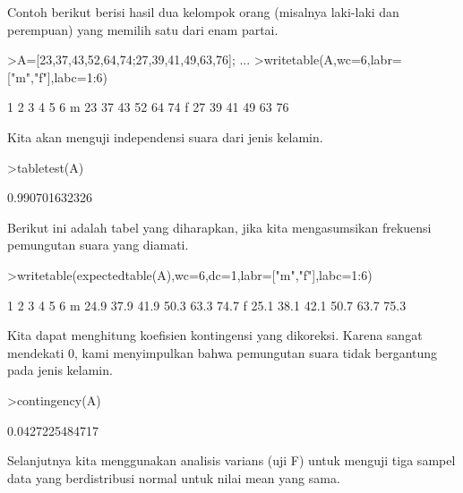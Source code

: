 \documentclass{article}
\begin{document}
\begin{eulernotebook}
\begin{eulercomment}
\begin{eulercomment}
\begin{eulercomment}
Contoh berikut berisi hasil dua kelompok orang (misalnya laki-laki dan
perempuan) yang memilih satu dari enam partai.
\end{eulercomment}
\begin{eulerprompt}
>A=[23,37,43,52,64,74;27,39,41,49,63,76];  ...
>writetable(A,wc=6,labr=["m","f"],labc=1:6)
\end{eulerprompt}
\begin{euleroutput}
             1     2     3     4     5     6
       m    23    37    43    52    64    74
       f    27    39    41    49    63    76
\end{euleroutput}
\begin{eulercomment}
Kita akan menguji independensi suara dari jenis kelamin.
\end{eulercomment}
\begin{eulerprompt}
>tabletest(A)
\end{eulerprompt}
\begin{euleroutput}
  0.990701632326
\end{euleroutput}
\begin{eulercomment}
Berikut ini adalah tabel yang diharapkan, jika kita mengasumsikan
frekuensi pemungutan suara yang diamati.
\end{eulercomment}
\begin{eulerprompt}
>writetable(expectedtable(A),wc=6,dc=1,labr=["m","f"],labc=1:6)
\end{eulerprompt}
\begin{euleroutput}
             1     2     3     4     5     6
       m  24.9  37.9  41.9  50.3  63.3  74.7
       f  25.1  38.1  42.1  50.7  63.7  75.3
\end{euleroutput}
\begin{eulercomment}
Kita dapat menghitung koefisien kontingensi yang dikoreksi. Karena
sangat mendekati 0, kami menyimpulkan bahwa pemungutan suara tidak
bergantung pada jenis kelamin.
\end{eulercomment}
\begin{eulerprompt}
>contingency(A)
\end{eulerprompt}
\begin{euleroutput}
  0.0427225484717
\end{euleroutput}
\begin{eulercomment}
\begin{eulercomment}
\begin{eulercomment}
Selanjutnya kita menggunakan analisis varians (uji F) untuk menguji
tiga sampel data yang berdistribusi normal untuk nilai mean yang sama.

\end{eulercomment}
\end{eulercomment}
\end{eulercomment}
\end{eulercomment}
\end{eulercomment}
\end{eulernotebook}
\end{document}
